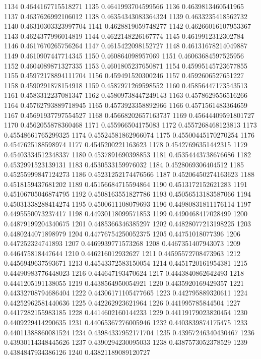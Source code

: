 1134 0.4644167715518271
1135 0.4641993704599566
1136 0.4639813460541965
1137 0.4637626992106012
1138 0.46354343083364324
1139 0.4633235418562732
1140 0.46310303323997704
1141 0.4628819059748277
1142 0.46266016107953367
1143 0.4624377996014819
1144 0.4622148226167774
1145 0.4619912312302784
1146 0.4617670265756264
1147 0.4615422098152727
1148 0.46131678214049887
1149 0.4610907447714345
1150 0.460864098957069
1151 0.46063684597525956
1152 0.4604089871327335
1153 0.4601805237650871
1154 0.45995145723677855
1155 0.45972178894111704
1156 0.459491520300246
1157 0.4592606527651227
1158 0.4590291878154918
1159 0.4587971269598552
1160 0.45856447173543513
1161 0.4583312237081347
1162 0.45809738447249143
1163 0.4578629556516266
1164 0.45762793889718945
1165 0.4573923358892966
1166 0.4571561483364659
1167 0.45691937797554527
1168 0.45668202657163737
1169 0.45644409591801727
1170 0.4562055878360468
1171 0.455966504175083
1172 0.4557268468123813
1173 0.45548661765299325
1174 0.45524581862966074
1175 0.45500445170270254
1176 0.4547625188598974
1177 0.4545200221163623
1178 0.45427696351442315
1179 0.45403334512348337
1180 0.4537891690398853
1181 0.45354443738676686
1182 0.4532991523139131
1183 0.4530533159976032
1184 0.4528069306404512
1185 0.45255999847124273
1186 0.45231252174476566
1187 0.45206450274163623
1188 0.4518159437681202
1189 0.45156684715594864
1190 0.4513172152621283
1191 0.45106705046874795
1192 0.4508163551827786
1193 0.45056513183587066
1194 0.45031338288414274
1195 0.4500611108079693
1196 0.44980831811176114
1197 0.4495550073237417
1198 0.44930118099571853
1199 0.4490468417028499
1200 0.44879199204340675
1201 0.4485366346385297
1202 0.44828077213198225
1203 0.4480244071898979
1204 0.44776754250052375
1205 0.44751018077396
1206 0.447252324741893
1207 0.4469939771573268
1208 0.4467351407943073
1209 0.446475818447644
1210 0.446216012932627
1211 0.44595572708473963
1212 0.4456949637593671
1213 0.44543372583150054
1214 0.4451720161954381
1215 0.44490983776448023
1216 0.444647193470624
1217 0.4443840862642493
1218 0.4441205191138055
1219 0.4438564950054921
1220 0.4435920169429357
1221 0.44332708794686404
1222 0.44306171105477665
1223 0.442795889320611
1224 0.44252962581440636
1225 0.442262923621964
1226 0.441995785844504
1227 0.4417282155983185
1228 0.4414602160144233
1229 0.44119179023820454
1230 0.4409229414290635
1231 0.44065367276005946
1232 0.4403839874175475
1233 0.44011388860081524
1234 0.43984337952171704
1235 0.43957246340430467
1236 0.43930114348445626
1237 0.4390294230095033
1238 0.4387573052378529
1239 0.4384847934386126
1240 0.43821189089120727

